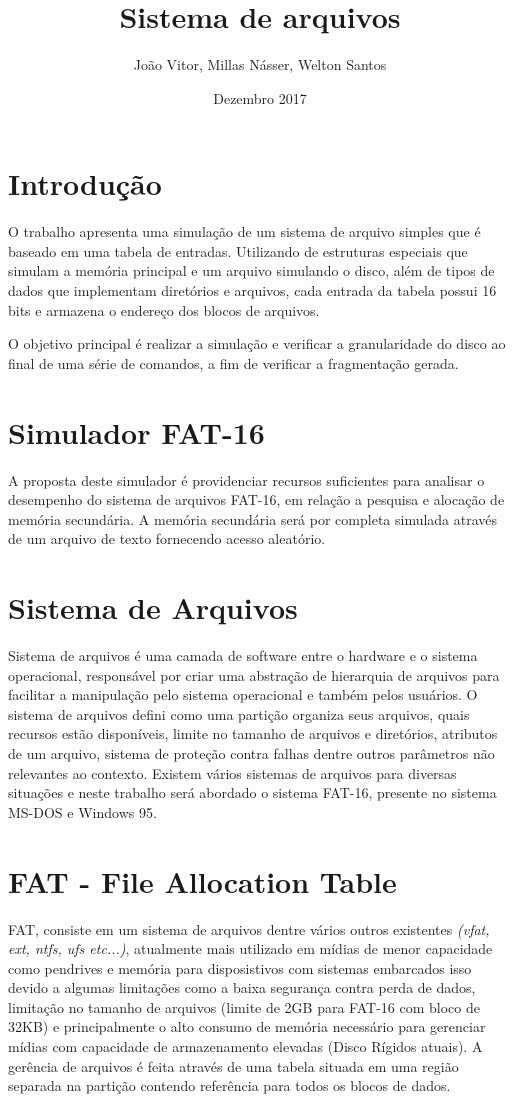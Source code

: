 \documentclass{article}
\title{Sistema de arquivos}
\author{João Vitor, Millas Násser, Welton Santos}
\date{Dezembro 2017}
\begin{document}
\maketitle

\section{Introdução}
	O trabalho apresenta uma simulação de um sistema de arquivo simples que é baseado em uma tabela de entradas. Utilizando de estruturas especiais que simulam a memória principal e um arquivo simulando o disco, além de tipos de dados que implementam diretórios e arquivos, cada entrada da tabela possui 16 bits e  armazena o endereço dos blocos de arquivos. 
	
	O objetivo principal é realizar a simulação e verificar a granularidade do disco ao final de uma série de comandos, a fim de verificar a fragmentação gerada.
    
\section{Simulador FAT-16} 
	A proposta deste simulador é providenciar recursos suficientes para analisar o desempenho do sistema de arquivos FAT-16, em relação a pesquisa e alocação de memória secundária. A memória secundária será por completa simulada através de um arquivo de texto fornecendo acesso aleatório. 

\section{Sistema de Arquivos} 
	Sistema de arquivos é uma camada de software entre o hardware e o sistema operacional, responsável por criar uma abstração de hierarquia de arquivos para facilitar a manipulação pelo sistema operacional e também pelos usuários. O sistema de arquivos defini como uma partição organiza seus arquivos, quais recursos estão disponíveis, limite no tamanho de arquivos e diretórios, atributos de um arquivo, sistema de proteção contra falhas dentre outros parâmetros não relevantes ao contexto. Existem vários sistemas de arquivos para diversas situações e neste trabalho será abordado o sistema FAT-16, presente no sistema MS-DOS e Windows 95. 

\section{FAT - File Allocation Table} 
	FAT, consiste em um sistema de arquivos dentre vários outros existentes \textit{(vfat, ext, ntfs, ufs etc...)}, atualmente mais utilizado em mídias de menor capacidade como pendrives e memória para disposistivos com sistemas embarcados isso devido a algumas limitações como a baixa segurança contra perda de dados, limitação no tamanho de arquivos (limite de 2GB para FAT-16 com bloco de 32KB) e principalmente o alto consumo de memória necessário para gerenciar mídias com capacidade de armazenamento elevadas (Disco Rígidos atuais). 
	A gerência de arquivos é feita através de uma tabela situada em uma região separada na partição contendo referência para todos os blocos de dados.  
\end{document}
